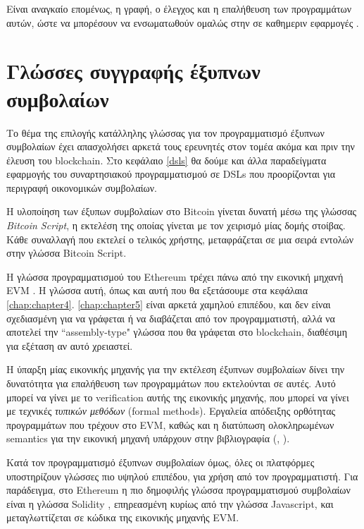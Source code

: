 Είναι αναγκαίο επομένως, η γραφή, ο έλεγχος και η επαλήθευση των προγραμμάτων αυτών, ώστε να 
μπορέσουν να ενσωματωθούν ομαλώς στην σε καθημεριν εφαρμογές . 


\section{Γλώσσες συγγραφής έξυπνων συμβολαίων}


Το θέμα της επιλογής κατάλληλης γλώσσας για τον προγραμματισμό έξυπνων συμβολαίων έχει  απασχολήσει
 αρκετά τους ερευνητές στον τομέα ακόμα και πριν την έλευση του blockchain. Στο κεφάλαιο \ref{dsls} θα
   δούμε και άλλα παραδείγματα εφαρμογής του συναρτησιακού προγραμματισμού σε DSLs που προορίζονται
   για περιγραφή οικονομικών συμβολαίων. 


              
              Η υλοποίηση των έξυπων συμβολαίων στο Bitcoin γίνεται δυνατή μέσω της γλώσσας 
              \textit{Bitcoin Script}, η εκτελέση της οποίας γίνεται με τον χειρισμό μίας δομής στοίβας. Κάθε
              συναλλαγή που εκτελεί ο τελικός χρήστης, μεταφράζεται σε μια σειρά εντολών στην γλώσσα
              Bitcoin Script. 


Η γλώσσα προγραμματισμού του Ethereum τρέχει πάνω από την εικονική μηχανή  EVM \cite{ethereum}. Η 
γλώσσα αυτή, όπως και αυτή που θα εξετάσουμε στα κεφάλαια \ref{chap:chapter4}. \ref{chap:chapter5} είναι
αρκετά χαμηλού επιπέδου, και δεν είναι σχεδιασμένη για να γράφεται ή να διαβάζεται από τον προγραμματιστή, αλλά να αποτελεί την ``assembly-type" γλώσσα που θα γράφεται στο blockchain, διαθέσιμη
για εξέταση αν αυτό χρειαστεί. 

Η ύπαρξη μίας εικονικής μηχανής για την εκτέλεση έξυπνων συμβολαίων δίνει την δυνατότητα για επαλήθευση των προγραμμάτων που εκτελούνται σε αυτές. Αυτό μπορεί να γίνει με το verification αυτής
της εικονικής μηχανής, που μπορεί να γίνει με τεχνικές \emph{τυπικών μεθόδων} (formal methods). Εργαλεία
απόδειξης ορθότητας προγραμμάτων που τρέχουν στο EVM, καθώς και η διατύπωση ολοκληρωμένων
semantics για την εικονική μηχανή υπάρχουν στην βιβλιογραφία (\cite{evmverification}, \cite{kevmverification}).

Κατά τον προγραμματισμό έξυπνων συμβολαίων όμως, όλες οι πλατφόρμες υποστηρίζουν γλώσσες πιο 
υψηλού επιπέδου, για χρήση από τον προγραμματιστή. Για παράδειγμα, στο Ethereum η πιο δημοφιλής 
γλώσσα προγραμματισμού συμβολαίων είναι η γλώσσα Solidity \cite{solidity}, επηρεασμένη κυρίως από 
την γλώσσα Javascript, και μεταγλωττίζεται σε κώδικα της εικονικής μηχανής EVM. 

